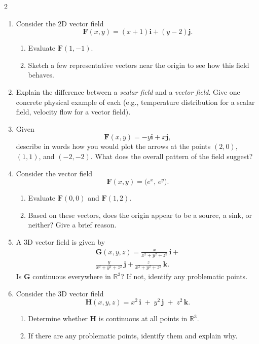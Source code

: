 \begin{multicols}{2}

\begin{enumerate}
\item 
Consider the 2D vector field
\[
\mathbf{F}(x,y) = (x+1)\mathbf{i} + (y-2)\mathbf{j}.
\]
\begin{enumerate}
\item Evaluate \(\mathbf{F}(1,-1)\).
\item Sketch a few representative vectors near the origin to see how this field behaves.
\end{enumerate}

\item 
Explain the difference between a \emph{scalar field} and a \emph{vector field}. Give one concrete physical example of each (e.g., temperature distribution for a scalar field, velocity flow for a vector field).

\item 
Given
\[
\mathbf{F}(x,y) = -y\mathbf{i} + x\mathbf{j},
\]
describe in words how you would plot the arrows at the points \((2,0)\), \((1,1)\), and \((-2,-2)\). What does the overall pattern of the field suggest?

\item 
Consider the vector field
\[
\mathbf{F}(x,y) = \bigl(e^x,\, e^y\bigr).
\]
\begin{enumerate}
\item Evaluate \(\mathbf{F}(0,0)\) and \(\mathbf{F}(1,2)\).
\item Based on these vectors, does the origin appear to be a source, a sink, or neither? Give a brief reason.
\end{enumerate}

\item \enspace
A 3D vector field is given by
    \begin{multline*}
\mathbf{G}(x,y,z) = \frac{x}{x^2 + y^2 + z^2} \,\mathbf{i} + \\
\frac{y}{x^2 + y^2 + z^2} \,\mathbf{j} + \frac{z}{x^2 + y^2 + z^2} \,\mathbf{k}.
    \end{multline*}
Is \(\mathbf{G}\) continuous everywhere in \(\mathbb{R}^3\)? If not, identify any problematic points.

\item 
Consider the 3D vector field
\[
\mathbf{H}(x,y,z) = x^2\,\mathbf{i} \;+\; y^2\,\mathbf{j} \;+\; z^2\,\mathbf{k}.
\]
\begin{enumerate}
\item Determine whether \(\mathbf{H}\) is continuous at all points in \(\mathbb{R}^3\).
\item If there are any problematic points, identify them and explain why.
\end{enumerate}


\end{enumerate}
\end{multicols}
